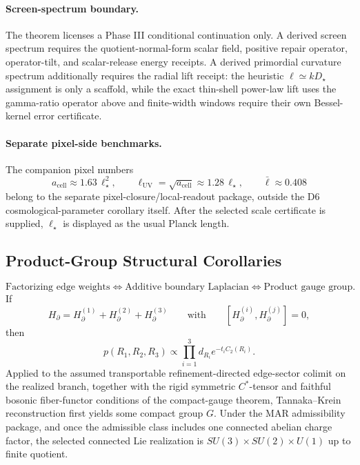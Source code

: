\paragraph{Screen-spectrum boundary.}
The theorem licenses a Phase III conditional continuation only. A derived screen spectrum requires
the quotient-normal-form scalar field, positive repair operator, operator-tilt, and scalar-release
energy receipts. A derived primordial curvature spectrum additionally requires the radial lift
receipt: the heuristic \(\ell\simeq kD_\star\) assignment is only a scaffold, while the exact
thin-shell power-law lift uses the gamma-ratio operator above and finite-width windows require their
own Bessel-kernel error certificate.

\paragraph{Separate pixel-side benchmarks.}
The companion pixel numbers
\[
a_{\mathrm{cell}}\approx 1.63\,\ell_\star^2,
\qquad
\ell_{\mathrm{UV}}=\sqrt{a_{\mathrm{cell}}}\approx 1.28\,\ell_\star,
\qquad
\bar{\ell}\approx 0.408
\]
belong to the separate pixel-closure/local-readout package, outside the D6 cosmological-parameter corollary itself. After the selected scale certificate is supplied, \(\ell_\star\) is displayed as the usual Planck length.

\subsection{Product-Group Structural Corollaries}

\begin{theorem}
\[
\text{Factorizing edge weights}
\Longleftrightarrow
\text{Additive boundary Laplacian}
\Longleftrightarrow
\text{Product gauge group}.
\]
If
\[
H_\partial=H_\partial^{(1)}+H_\partial^{(2)}+H_\partial^{(3)}
\qquad\text{with}\qquad
[H_\partial^{(i)},H_\partial^{(j)}]=0,
\]
then
\[
p(R_1,R_2,R_3)\propto\prod_{i=1}^3 d_{R_i}e^{-t_iC_2(R_i)}.
\]
Applied to the assumed transportable refinement-directed edge-sector colimit on the realized
branch, together with the rigid symmetric
\(C^*\)-tensor and faithful bosonic fiber-functor conditions of the compact-gauge theorem,
Tannaka--Krein reconstruction first yields some compact group \(G\). Under the MAR admissibility
package, and once the admissible class includes one connected abelian charge factor, the selected
connected Lie realization is \(SU(3)\times SU(2)\times U(1)\) up to finite quotient.
\end{theorem}

